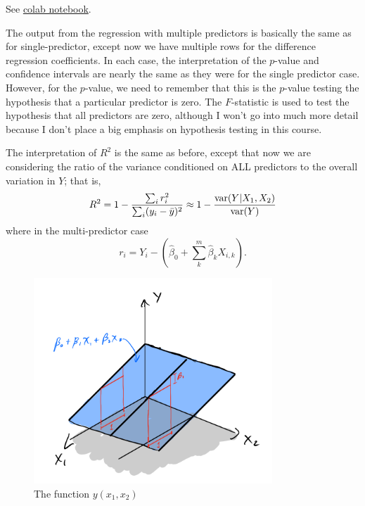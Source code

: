 \begin{example}
See \href{https://colab.research.google.com/drive/1oIRgP_7-c5DGV1D2iz5nj406mZfJxUIG?usp=sharing}{colab notebook}. 
\end{example}

The output from the regression with multiple predictors is basically the same as for single-predictor, except now we have multiple rows for the difference regression coefficients. In each case, the interpretation of the $p$-value and confidence intervals are nearly the same as they were for the single predictor case. However, for the $p$-value, we need to remember that this is the $p$-value testing the hypothesis that a particular predictor is zero. The $F$-statistic is used to test the hypothesis that all predictors are zero, although I won't go into much more detail because I don't place a big emphasis on hypothesis testing in this course. 

 The interpretation of $R^2$ is the same as before, except that now we are considering the ratio of the variance conditioned on ALL predictors to the overall variation in $Y$; that is, 
\begin{equation*}
R^2 = 1 - \frac{\sum_i r_i^2}{\sum_i (y_i - \bar{y})^2}    \approx 1 - \frac{{\rm var}(Y|X_1,X_2)}{{\rm var}(Y)}
\end{equation*} 
where in the multi-predictor case 
\begin{equation}
r_i = Y_i - \left(\hat{\beta}_0 + \sum_k^m \hat{\beta}_kX_{i,k}\right). 
\end{equation} 



\begin{figure}[h!]
    \centering
    \includegraphics[width=0.8\textwidth]{./../figures/plane}
    \caption{The function $y(x_1,x_2)$}
    \label{fig:plane}
\end{figure}

